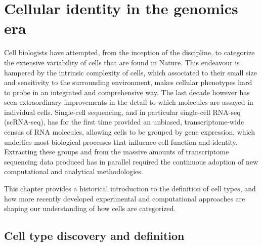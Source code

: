 
\chapter{Cellular identity in the genomics era}  %

\ifpdf
    \graphicspath{{Chapter1/Figs/Raster/}{Chapter1/Figs/PDF/}{Chapter1/Figs/}}
\else
    \graphicspath{{Chapter1/Figs/Vector/}{Chapter1/Figs/}}
\fi

Cell biologists have attempted, from the inception of the discipline, to categorize the extensive variability of cells that are found in Nature. This endeavour is hampered by the intrinsic complexity of cells, which associated to their small size and sensitivity to the surrounding environment, makes cellular phenotypes hard to probe in an integrated and comprehensive way. The last decade however has seen extraordinary improvements in the detail to which molecules are assayed in individual cells. Single-cell sequencing, and in particular single-cell RNA-seq (scRNA-seq), has for the first time provided an unbiased, transcriptome-wide census of RNA molecules, allowing cells to be grouped by gene expression, which underlies most biological processes that influence cell function and identity. Extracting these groups and from the massive amounts of transcriptome sequencing data produced has in parallel required the continuous adoption of new computational and analytical methodologies.

This chapter provides a historical introduction to the definition of cell types, and how more recently developed experimental and computational approaches are shaping our understanding of how cells are categorized.


\section{Cell type discovery and definition} %
\label{section1.1}

